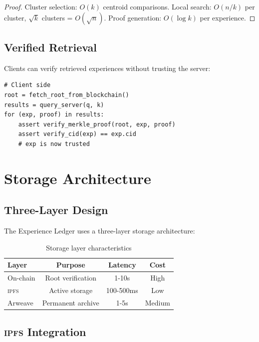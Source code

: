 \documentclass[11pt,letterpaper]{article}
\newcommand{\IPFS}{\textsc{ipfs}}
\begin{document}
\begin{proof}
Cluster selection: $O(k)$ centroid comparisons. Local search: $O(n/k)$ per cluster, $\sqrt{k}$ clusters = $O(\sqrt{n})$. Proof generation: $O(\log k)$ per experience.
\end{proof}

\subsection{Verified Retrieval}

Clients can verify retrieved experiences without trusting the server:

\begin{lstlisting}[caption=Verified Retrieval Protocol]
# Client side
root = fetch_root_from_blockchain()
results = query_server(q, k)
for (exp, proof) in results:
    assert verify_merkle_proof(root, exp, proof)
    assert verify_cid(exp) == exp.cid
    # exp is now trusted
\end{lstlisting}

\section{Storage Architecture}
\label{sec:storage}

\subsection{Three-Layer Design}

The Experience Ledger uses a three-layer storage architecture:

\begin{table}[t]
\centering
\begin{tabular}{lccc}
\toprule
\textbf{Layer} & \textbf{Purpose} & \textbf{Latency} & \textbf{Cost} \\
\midrule
On-chain & Root verification & 1-10s & High \\
\IPFS{} & Active storage & 100-500ms & Low \\
Arweave & Permanent archive & 1-5s & Medium \\
\bottomrule
\end{tabular}
\caption{Storage layer characteristics}
\label{tab:storage}
\end{table}

\subsection{\IPFS{} Integration}
\end{document}
